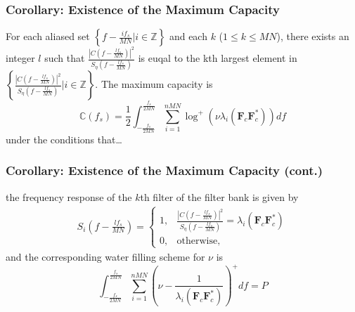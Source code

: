 \documentclass{beamer}
\begin{document}
\begin{frame}
\frametitle{Corollary: Existence of the Maximum Capacity}
\begin{block}{}
  For each aliased set $\left\{f-\frac{if_s}{MN}|i\in\mathbb{Z}\right\}$ and each $k$ ($1\leq k\leq MN$), there exists an integer $l$ such that $\frac{|C(f-\frac{lf_s}{MN})|^2}{S_\eta(f-\frac{lf_s}{MN})}$ is euqal to the kth largest element in $\left\{\frac{|C(f-\frac{lf_s}{MN})|^2}{S_\eta(f-\frac{lf_s}{MN})} | i\in\mathbb{Z}\right\}$. The maximum capacity is
  \begin{equation}
    \mathbb{C}(f_s)  =\frac{1}{2}\int_{-\frac{f_s}{2MN}}^{\frac{f_s}{2MN}}\sum_{i=1}^{nMN}\log^+\left(\nu\lambda_i\left(\pmb{F}_{c}\pmb{F}_{c}^*\right)\right)df
  \end{equation}
  under the conditions that\dots
\end{block}
\end{frame}

\begin{frame}
\frametitle{Corollary: Existence of the Maximum Capacity (cont.)}
\begin{block}{}
  the frequency response of the $k$th filter of the filter bank is given by
  \begin{align}
    S_i\left(f-\frac{lf_s}{MN}\right) = \begin{cases} 1,& \frac{|C(f-\frac{lf_s}{MN})|^2}{S_\eta(f-\frac{lf_s}{MN})}=\lambda_i\left(\pmb{F}_{c}\pmb{F}_{c}^*\right) \\
      0,& \mbox{otherwise,} \end{cases}
  \end{align}
  and the corresponding water filling scheme for $\nu$ is
  \begin{equation}
    \int_{-\frac{f_s}{2MN}}^{\frac{f_s}{2MN}}\sum_{i=1}^{nMN}\left(\nu - \frac{1}{\lambda_i\left(\pmb{F}_{c}\pmb{F}_{c}^*\right)}\right)^+df = P
  \end{equation}
\end{block}
\end{frame}

%
%
%
\end{document}
